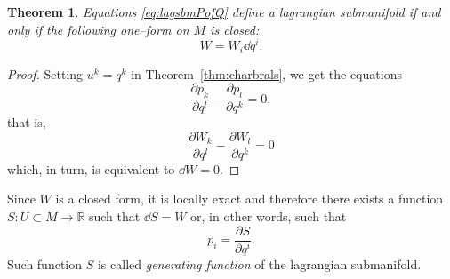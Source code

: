 \documentclass[english,fontsize=11pt,paper=b5]{scrbook}
\newtheorem{theorem}{Theorem}[chapter]
\theoremstyle{definition}
\begin{document}
    \begin{theorem}\label{thm:lsoform}
      Equations \eqref{eq:lagsbmPofQ} define a lagrangian submanifold if and only if the following one--form on $M$ is closed:
      \begin{equation}
        W = W_i \dd q^i.
      \end{equation}
    \end{theorem}
    \begin{proof}
      Setting $u^k = q^k$ in Theorem~\ref{thm:charbrals}, we get the equations
      \begin{equation}
        \frac{\partial p_k}{\partial q^l} - \frac{\partial p_l}{\partial q^k} = 0,
      \end{equation}
      that is,
      \begin{equation}
        \frac{\partial W_k}{\partial q^l} - \frac{\partial W_l}{\partial q^k} = 0
      \end{equation}
      which, in turn, is equivalent to $\dd W = 0$.
    \end{proof}

    Since $W$ is a closed form, it is locally exact and therefore there exists a function $S: U \subset M \to \mathbb{R}$ such that $\dd S = W$ or, in other words, such that
    \begin{equation}
      p_i = \frac{\partial S}{\partial q^i}.
    \end{equation}
    Such function $S$ is called \emph{generating function} of the lagrangian submanifold.
\end{document}
